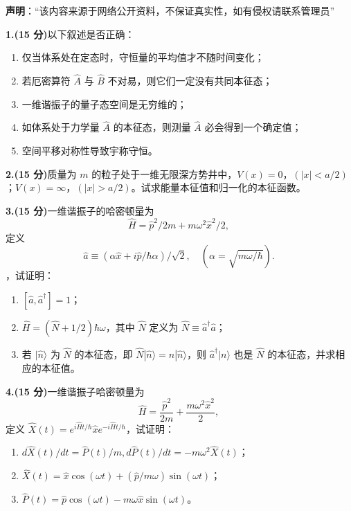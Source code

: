 
\textbf{声明}：“该内容来源于网络公开资料，不保证真实性，如有侵权请联系管理员”

\textbf{1.(15 分)}以下叙述是否正确：

\begin{enumerate}
    \item  仅当体系处在定态时，守恒量的平均值才不随时间变化；
    \item  若厄密算符 $\hat{A}$ 与 $\hat{B}$ 不对易，则它们一定没有共同本征态；
    \item  一维谐振子的量子态空间是无穷维的；
    \item  如体系处于力学量 $\hat{A}$ 的本征态，则测量 $\hat{A}$ 必会得到一个确定值；
    \item  空间平移对称性导致宇称守恒。
\end{enumerate}

\textbf{2.(15 分)}质量为 $m$ 的粒子处于一维无限深方势井中，$V(x) = 0$，$(|x| < a/2)$；$V(x) = \infty$，$(|x| > a/2)$。试求能量本征值和归一化的本征函数。

\textbf{3.(15 分)}一维谐振子的哈密顿量为 
$$\hat{H} = \hat{p}^2/2m + m\omega^2 \hat{x}^2/2,~$$ 
定义
$$\hat{a} \equiv (\alpha \hat{x} + i \hat{p}/\hbar\alpha)/\sqrt{2}, \quad (\alpha = \sqrt{m \omega / \hbar}).~$$，试证明：
\begin{enumerate}
    \item  $[\hat{a}, \hat{a}^\dagger] = 1$；
    \item  $\hat{H} = (\hat{N} + 1/2)\hbar \omega$，其中 $\hat{N}$ 定义为 $\hat{N} \equiv \hat{a}^\dagger \hat{a}$；
    \item  若 $|\hat{n}\rangle$ 为 $\hat{N}$ 的本征态，即 $\hat{N}|\hat{n}\rangle = n|\hat{n}\rangle$，则 $\hat{a}^\dagger|n\rangle$ 也是 $\hat{N}$ 的本征态，并求相应的本征值。
\end{enumerate}

\textbf{4.(15 分)}一维谐振子哈密顿量为 
$$\hat{H} = \frac{\hat{p}^2}{2m} + \frac{m\omega^2 \hat{x}^2}{2},~$$ 
定义 $\hat{X}(t) = e^{i\hat{H}t/\hbar} \hat{x} e^{-i\hat{H}t/\hbar}$，试证明：
\begin{enumerate}
    \item  $d\hat{X}(t)/{dt} = \hat{P}(t)/{m}, d\hat{P}(t)/{dt} = -m\omega^2 \hat{X}(t)$；
    \item  $\hat{X}(t) = \hat{x} \cos(\omega t) + (\hat{p}/{m\omega} )\sin(\omega t)$；
    \item  $\hat{P}(t) = \hat{p} \cos(\omega t) - m\omega \hat{x} \sin(\omega t)$。
\end{enumerate}

